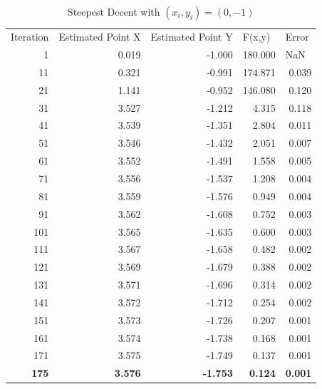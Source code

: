 \documentclass[12pt]{article}
\begin{document}
\begin{table}[h!]
  \centering
  \caption{Steepest Decent with $(x_i,y_i) = (0,-1)$}
    \begin{tabular}{rrrrr}
    \multicolumn{1}{l}{Iteration } & \multicolumn{1}{l}{Estimated Point X} & \multicolumn{1}{l}{Estimated Point Y} & \multicolumn{1}{l}{F(x,y)} & \multicolumn{1}{l}{Error} \\
    1     & 0.019 & -1.000 & 180.000 & \multicolumn{1}{l}{NaN} \\
    11    & 0.321 & -0.991 & 174.871 & 0.039 \\
    21    & 1.141 & -0.952 & 146.080 & 0.120 \\
    31    & 3.527 & -1.212 & 4.315 & 0.118 \\
    41    & 3.539 & -1.351 & 2.804 & 0.011 \\
    51    & 3.546 & -1.432 & 2.051 & 0.007 \\
    61    & 3.552 & -1.491 & 1.558 & 0.005 \\
    71    & 3.556 & -1.537 & 1.208 & 0.004 \\
    81    & 3.559 & -1.576 & 0.949 & 0.004 \\
    91    & 3.562 & -1.608 & 0.752 & 0.003 \\
    101   & 3.565 & -1.635 & 0.600 & 0.003 \\
    111   & 3.567 & -1.658 & 0.482 & 0.002 \\
    121   & 3.569 & -1.679 & 0.388 & 0.002 \\
    131   & 3.571 & -1.696 & 0.314 & 0.002 \\
    141   & 3.572 & -1.712 & 0.254 & 0.002 \\
    151   & 3.573 & -1.726 & 0.207 & 0.001 \\
    161   & 3.574 & -1.738 & 0.168 & 0.001 \\
    171   & 3.575 & -1.749 & 0.137 & 0.001 \\
    \textbf{175} & \textbf{3.576} & \textbf{-1.753} & \textbf{0.124} & \textbf{0.001} \\
    \end{tabular}%
  \label{tab:SDM_guess3}%
\end{table}%
\end{document}
